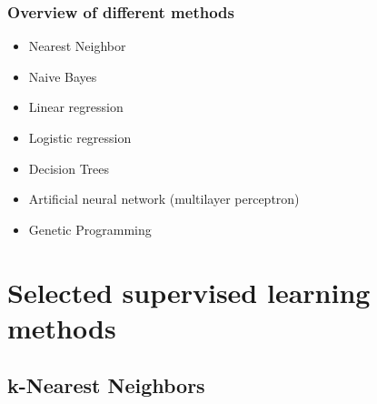 \documentclass[aspectratio=169]{beamer}
\begin{document}



  


\begin{frame}
  \frametitle{Overview of different methods}
  \begin{block}{}
    \begin{center}
      \begin{itemize}
      \item Nearest Neighbor
      \item Naive Bayes
      \item Linear regression
      \item Logistic regression
      \item Decision Trees
      \item Artificial neural network (multilayer perceptron)
      \item Genetic Programming
      \end{itemize}
    \end{center}    
  \end{block}
\end{frame}

\section{Selected supervised learning methods}

\begin{frame}{}
   \tableofcontents[currentsection]
\end{frame}

\subsection{k-Nearest Neighbors}
\end{document}
